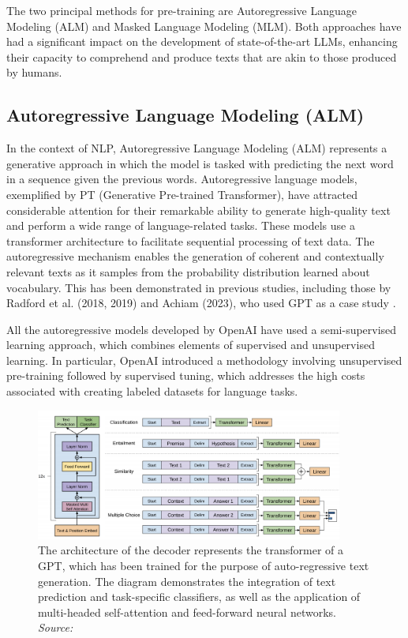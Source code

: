 The two principal methods for pre-training are Autoregressive Language Modeling (ALM) and Masked Language Modeling (MLM). Both approaches have had a significant impact on the development of state-of-the-art LLMs, enhancing their capacity to comprehend and produce texts that are akin to those produced by humans.

\subsection{Autoregressive Language Modeling (ALM)}

In the context of NLP, Autoregressive Language Modeling (ALM) represents a generative approach in which the model is tasked with predicting the next word in a sequence given the previous words. Autoregressive language models, exemplified by PT (Generative Pre-trained Transformer), have attracted considerable attention for their remarkable ability to generate high-quality text and perform a wide range of language-related tasks. These models use a transformer architecture to facilitate sequential processing of text data. The autoregressive mechanism enables the generation of coherent and contextually relevant texts as it samples from the probability distribution learned about vocabulary. This has been demonstrated in previous studies, including those by Radford et al. (2018, 2019) and Achiam (2023), who used GPT as a case study \cite{radford2018improving, radford2019language, achiam2023gpt}.

All the autoregressive models developed by OpenAI have used a semi-supervised learning approach, which combines elements of supervised and unsupervised learning. In particular, OpenAI introduced a methodology involving unsupervised pre-training followed by supervised tuning, which addresses the high costs associated with creating labeled datasets for language tasks.

\begin{figure}[h]
    \centering
    \includegraphics[width=0.9\textwidth]{images/llms/gpt.png}
    \caption{The architecture of the decoder represents the transformer of a GPT, which has been trained for the purpose of auto-regressive text generation. The diagram demonstrates the integration of text prediction and task-specific classifiers, as well as the application of multi-headed self-attention and feed-forward neural networks. \textit{Source:} \cite{radford2018improving}}
    \label{fig:transformer_architecture}
\end{figure}

